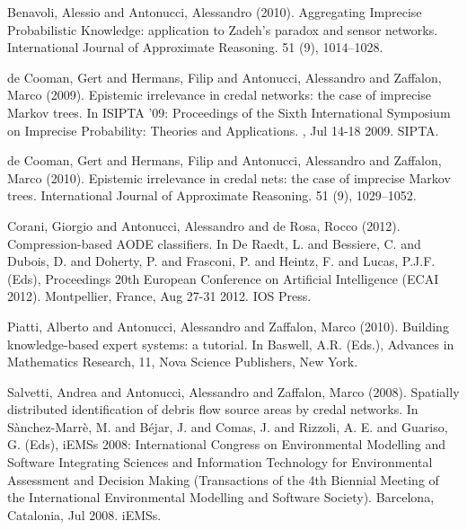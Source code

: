 \begin{cventries}
\begin{cvitems}
\item Benavoli, Alessio and Antonucci, Alessandro (2010).   Aggregating Imprecise Probabilistic Knowledge: application to Zadeh’s paradox and sensor networks.   International Journal of Approximate Reasoning. 51 (9), 1014–1028.
\item de Cooman, Gert and Hermans, Filip and Antonucci, Alessandro and Zaffalon, Marco (2009).   Epistemic irrelevance in credal networks: the case of imprecise Markov trees.   In ISIPTA ’09: Proceedings of the Sixth International Symposium on Imprecise Probability: Theories and Applications.   ,   Jul 14-18 2009.   SIPTA.
\item de Cooman, Gert and Hermans, Filip and Antonucci, Alessandro and Zaffalon, Marco (2010).   Epistemic irrelevance in credal nets: the case of imprecise Markov trees.   International Journal of Approximate Reasoning. 51 (9), 1029–1052.
\item Corani, Giorgio and Antonucci, Alessandro and de Rosa, Rocco (2012).   Compression-based AODE classifiers.   In De Raedt, L. and Bessiere, C. and Dubois, D. and Doherty, P. and Frasconi, P. and Heintz, F. and Lucas, P.J.F. (Eds), Proceedings 20th European Conference on Artificial Intelligence (ECAI 2012).   Montpellier, France,   Aug 27-31 2012.   IOS Press.
\item Piatti, Alberto and Antonucci, Alessandro and Zaffalon, Marco (2010).   Building knowledge-based expert systems: a tutorial.   In Baswell, A.R. (Eds.), Advances in Mathematics Research, 11, Nova Science Publishers, New York.
\item Salvetti, Andrea and Antonucci, Alessandro and Zaffalon, Marco (2008).   Spatially distributed identification of debris flow source areas by credal networks.   In Sànchez-Marrè, M. and Béjar, J. and Comas, J. and Rizzoli, A. E. and Guariso, G. (Eds), iEMSs 2008: International Congress on Environmental Modelling and Software Integrating Sciences and Information Technology for Environmental Assessment and Decision Making (Transactions of the 4th Biennial Meeting of the International Environmental Modelling and Software Society).   Barcelona, Catalonia,   Jul 2008.   iEMSs.
\end{cvitems}
\end{cventries}
\vskip 2mm
